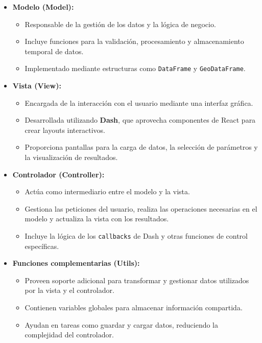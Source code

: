\begin{itemize}
    \item \textbf{Modelo (Model):}
    \begin{itemize}
        \item Responsable de la gestión de los datos y la lógica de negocio.
        \item Incluye funciones para la validación, procesamiento y almacenamiento temporal de datos.
        \item Implementado mediante estructuras como \texttt{DataFrame} y \texttt{GeoDataFrame}.
    \end{itemize}
    \item \textbf{Vista (View):}
    \begin{itemize}
        \item Encargada de la interacción con el usuario mediante una interfaz gráfica.
        \item Desarrollada utilizando \textbf{Dash}, que aprovecha componentes de React para crear layouts interactivos.
        \item Proporciona pantallas para la carga de datos, la selección de parámetros y la visualización de resultados.
    \end{itemize}
    \item \textbf{Controlador (Controller):}
    \begin{itemize}
        \item Actúa como intermediario entre el modelo y la vista.
        \item Gestiona las peticiones del usuario, realiza las operaciones necesarias en el modelo y actualiza la vista con los resultados.
        \item Incluye la lógica de los \texttt{callbacks} de Dash y otras funciones de control específicas.
    \end{itemize}
    \item \textbf{Funciones complementarias (Utils):}
    \begin{itemize}
        \item Proveen soporte adicional para transformar y gestionar datos utilizados por la vista y el controlador.
        \item Contienen variables globales para almacenar información compartida.
        \item Ayudan en tareas como guardar y cargar datos, reduciendo la complejidad del controlador.
    \end{itemize}
\end{itemize}

